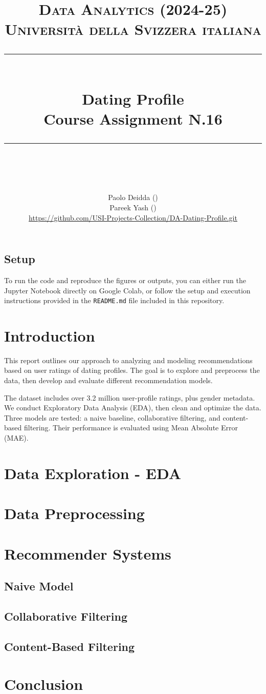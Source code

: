 \documentclass{article}
\title{
	\normalfont\normalsize
	\textsc{Data Analytics (2024-25)\\
	Universit\`a della Svizzera italiana}\\
	\rule{\linewidth}{0.5pt}\\
	{\huge Dating Profile\\
	\small Course Assignment N.16}\\
	\rule{\linewidth}{1pt}\\
	\vspace{5pt}
}
\author{
	Paolo Deidda (\text{paolo.deidda@usi.ch}) \\ 
	Pareek Yash (\text{yash.pareek@usi.ch})\\
	\url{https://github.com/USI-Projects-Collection/DA-Dating-Profile.git}
	}
\begin{document}
\maketitle

\tableofcontents


\vspace*{\fill}

\subsection*{Setup}

To run the code and reproduce the figures or outputs, you can either run the Jupyter Notebook directly on Google Colab, or follow the setup and execution instructions provided in the \texttt{README.md} file included in this repository.


\section*{Introduction}

This report outlines our approach to analyzing and modeling recommendations based on user ratings of dating profiles. The goal is to explore and preprocess the data, then develop and evaluate different recommendation models.

The dataset includes over 3.2 million user-profile ratings, plus gender metadata. We conduct Exploratory Data Analysis (EDA), then clean and optimize the data. Three models are tested: a naive baseline, collaborative filtering, and content-based filtering. Their performance is evaluated using Mean Absolute Error (MAE).


\newpage

\section{Data Exploration - EDA}


\section{Data Preprocessing}



\section{Recommender Systems}
\subsection{Naive Model}

\subsection{Collaborative Filtering}

\subsection{Content-Based Filtering}


\section{Conclusion}

\end{document}
